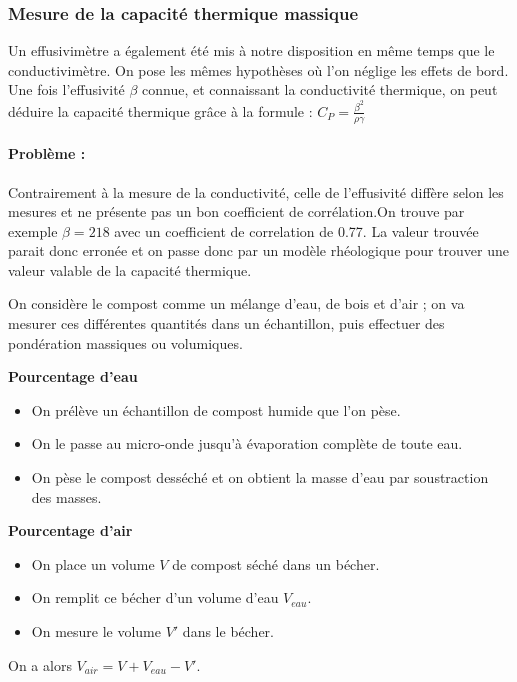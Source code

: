 \documentclass[../PS6_RapportFinal.tex]{subfiles}
\begin{document}
\subsubsection{Mesure de la capacité thermique massique}


Un effusivimètre a également été mis à notre disposition en même temps que le conductivimètre. On pose les mêmes hypothèses où l'on néglige les effets de bord. Une fois l'effusivité $\beta$ connue, et connaissant la conductivité thermique, on peut déduire la capacité thermique grâce à la formule : $ C_{P} = \frac{\beta^{2}}{\rho \gamma}$

\paragraph{Problème :} 
 Contrairement à la mesure de la conductivité, celle de l'effusivité diffère selon les mesures et ne présente pas un bon coefficient de corrélation.On trouve par exemple \(\beta = 218 \) avec un coefficient de correlation de \num{0.77}. La valeur trouvée parait donc erronée et on passe donc par un modèle rhéologique pour trouver une valeur valable de la capacité thermique. 
 



On considère le compost comme un mélange d'eau, de bois et d'air ; on va mesurer ces différentes quantités dans un échantillon, puis effectuer des pondération massiques ou volumiques.



\textbf{Pourcentage d'eau}

\begin{itemize}
\item On prélève un échantillon de compost humide que l'on pèse.
\item On le passe au micro-onde jusqu'à évaporation complète de toute eau.
\item On pèse le compost desséché et on obtient la masse d'eau par soustraction des masses.
\end{itemize}



\textbf{Pourcentage d'air}

\begin{itemize}
\item On place un volume $V$ de compost séché dans un bécher.
\item On remplit ce bécher d'un volume d'eau $V_{eau}$.
\item On mesure le volume $V'$ dans le bécher.
\end{itemize}
On a alors $V_{air} = V + V_{eau} - V'$.
\end{document}
